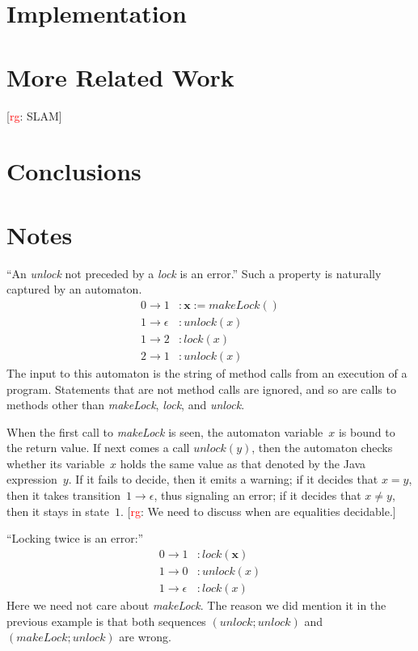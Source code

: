 \documentclass[a4paper]{article}
\newcommand{\rg}[1]{\todo{rg}{#1}}
\newcommand{\todo}[2]{{\small [\textcolor{red}{#1}: #2]}}
\theoremstyle{slanted}
\theoremstyle{definition}
\theoremstyle{remark}
\begin{document}
\section{Implementation}

\section{More Related Work}

\rg{SLAM}
\section{Conclusions}
\section{Notes}

``An \textit{unlock} not preceded by a \textit{lock} is an error.''
Such a property is naturally captured by an automaton.
\begin{equation}\label{eq:unlockunlock}
\begin{aligned}
0\to1&: \mathbf{x} := \mathit{makeLock}()\\
1\to\epsilon&: \mathit{unlock}(x)\\
1\to2&: \mathit{lock}(x)\\
2\to1&: \mathit{unlock}(x)
\end{aligned}
\end{equation}
The input to this automaton is the string of method calls from an execution of a program.
Statements that are not method calls are ignored, and so are calls to methods other than \textit{makeLock}, \textit{lock}, and \textit{unlock}.

When the first call to \textit{makeLock} is seen, the automaton variable~$x$ is bound to the return value.
If next comes a call $\mathit{unlock}(y)$, then the automaton checks whether its variable~$x$ holds the same value as that denoted by the Java expression~$y$.
If it fails to decide, then it emits a warning; if it decides that $x=y$, then it takes transition~$1\to\epsilon$, thus signaling an error; if it decides that $x\ne y$, then it stays in state~$1$.
\rg{We need to discuss when are equalities decidable.}

``Locking twice is an error:''
\begin{equation}
\begin{aligned}
0\to1&: \mathit{lock}(\mathbf x)\\
1\to0&: \mathit{unlock}(x)\\
1\to\epsilon&: \mathit{lock}(x)
\end{aligned}
\end{equation}
Here we need not care about \textit{makeLock}.
The reason we did mention it in the previous example is that both sequences $(\mathit{unlock}; \mathit{unlock})$ and $(\mathit{makeLock}; \mathit{unlock})$ are wrong.
\end{document}
